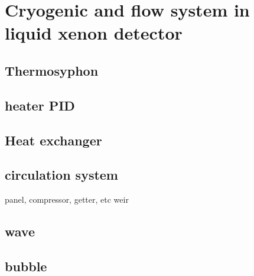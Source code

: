 \chapter{Cryogenic and flow system in liquid xenon detector}
\section{Thermosyphon}
\section{heater PID}
\section{Heat exchanger}
\section{circulation system}
panel, compressor, getter, etc
weir

\section{wave}

\section{bubble}
